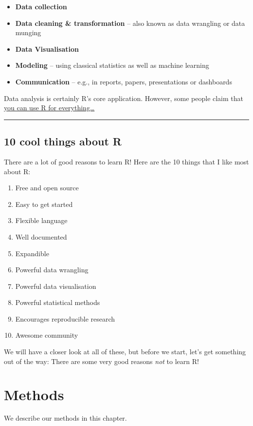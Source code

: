 \documentclass[
]{book}
\providecommand{\tightlist}{%
  \setlength{\itemsep}{0pt}\setlength{\parskip}{0pt}}
\begin{document}
\begin{itemize}
\tightlist
\item
  \textbf{Data collection}
\item
  \textbf{Data cleaning \& transformation} -- also known as data
  wrangling or data munging
\item
  \textbf{Data Visualisation}
\item
  \textbf{Modeling} -- using classical statistics as well as machine
  learning
\item
  \textbf{Communication} -- e.g., in reports, papers, presentations or
  dashboards
\end{itemize}

Data analysis is certainly R's core application. However, some people
claim that \href{https://youtu.be/m6nUdoP6894}{you can use R for
everything\ldots{}}

\begin{center}\rule{0.5\linewidth}{0.5pt}\end{center}

\hypertarget{cool-things-about-r}{%
\section{10 cool things about R}\label{cool-things-about-r}}

There are a lot of good reasons to learn R! Here are the 10 things that
I like most about R:

\begin{enumerate}
\def\labelenumi{\arabic{enumi}.}
\tightlist
\item
  Free and open source
\item
  Easy to get started
\item
  Flexible language
\item
  Well documented
\item
  Expandible
\item
  Powerful data wrangling
\item
  Powerful data visualisation
\item
  Powerful statistical methods
\item
  Encourages reproducible research
\item
  Awesome community
\end{enumerate}

We will have a closer look at all of these, but before we start, let's
get something out of the way: There are some very good reasons
\emph{not} to learn R!

\hypertarget{methods}{%
\chapter{Methods}\label{methods}}

We describe our methods in this chapter.

\backmatter
\end{document}
